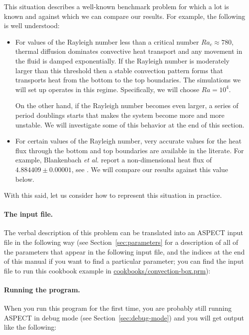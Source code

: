 \documentclass{article}
\newcommand{\aspect}{\textsc{ASPECT}}
\begin{document}
This situation describes a well-known benchmark problem for which a lot is
known and against which we can compare our results. For example, the following
is well understood:
\begin{itemize}
  \item For values of the Rayleigh number less than a critical number
  $Ra_c\approx 780$, thermal diffusion dominates convective heat transport and
  any movement in the fluid is damped exponentially. If the Rayleigh number is moderately larger
  than this threshold then a stable convection pattern forms that transports
  heat from the bottom to the top boundaries. The simulations we will set up
  operates in this regime. Specifically, we will choose $Ra=10^4$.

  On the other hand, if the Rayleigh number becomes even larger, a series of
  period doublings starts that makes the system become more and more unstable.
  We will investigate some of this behavior at the end of this section.

  \item For certain values of the Rayleigh number, very accurate values for the
  heat flux through the bottom and top boundaries are available in the literate.
  For example, Blankenbach \textit{et al.} report a non-dimensional heat flux of
  $4.884409 \pm 0.00001$, see \cite{BBC89}. We will compare our results against
  this value below.
\end{itemize}

With this said, let us consider how to represent this situation in practice.


\paragraph{The input file.}
The verbal description of this problem can be translated into an \aspect{}
input file in the following way (see Section~\ref{sec:parameters} for a
description of all of the parameters that appear in the following input file,
and the indices at the end of this manual if you want to find a particular
parameter; you can find the input file to run this cookbook example in
\url{cookbooks/convection-box.prm}):




\paragraph{Running the program.}
When you run this program for the first time, you are probably still running
\aspect{} in debug mode (see Section~\ref{sec:debug-mode}) and you will get
output like the following:
\end{document}
